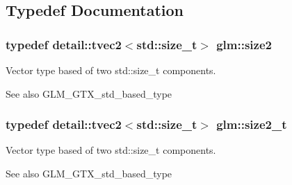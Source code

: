 \subsection{Typedef Documentation}
\hypertarget{group__gtx__std__based__type_ga0fa18ecab85aa909d4460e1a15e29b13}{}
\subsubsection[{size2}]{\setlength{\rightskip}{0pt plus 5cm}typedef detail\+::tvec2$<$std\+::size\+\_\+t$>$ {\bf glm\+::size2}}\label{group__gtx__std__based__type_ga0fa18ecab85aa909d4460e1a15e29b13}
Vector type based of two std\+::size\+\_\+t components. \begin{DoxySeeAlso}{See also}
G\+L\+M\+\_\+\+G\+T\+X\+\_\+std\+\_\+based\+\_\+type 
\end{DoxySeeAlso}
\hypertarget{group__gtx__std__based__type_gafc6ee1f14c4940c0dd86226f9e8d51ae}{}
\subsubsection[{size2\+\_\+t}]{\setlength{\rightskip}{0pt plus 5cm}typedef detail\+::tvec2$<$std\+::size\+\_\+t$>$ {\bf glm\+::size2\+\_\+t}}\label{group__gtx__std__based__type_gafc6ee1f14c4940c0dd86226f9e8d51ae}
Vector type based of two std\+::size\+\_\+t components. \begin{DoxySeeAlso}{See also}
G\+L\+M\+\_\+\+G\+T\+X\+\_\+std\+\_\+based\+\_\+type 
\end{DoxySeeAlso}
\hypertarget{group__gtx__std__based__type_gaecfda56edf7fb1a0b98401c8cca8ffd6}{}

